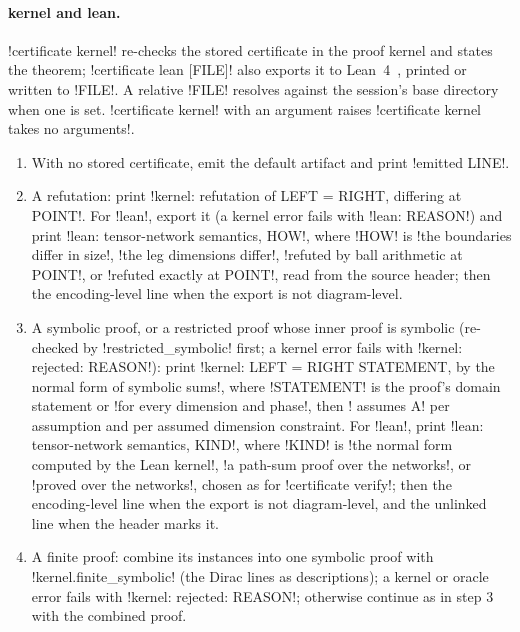 \paragraph{kernel and lean.} \code!certificate kernel! re-checks the stored certificate in the proof kernel and states the theorem; \code!certificate lean [FILE]! also exports it to Lean~4~\cite{demoura2021lean4}, printed or written to \code!FILE!. A relative \code!FILE! resolves against the session's base directory when one is set. \code!certificate kernel! with an argument raises \code!certificate kernel takes no arguments!.

\begin{algorithm}\label{alg:language-kernel}
\leavevmode
\begin{enumerate}
\item With no stored certificate, emit the default artifact and print \code!emitted LINE!.
\item A refutation: print \code!kernel: refutation of LEFT = RIGHT, differing at POINT!. For \code!lean!, export it (a kernel error fails with \code!lean: REASON!) and print \code!lean: tensor-network semantics, HOW!, where \code!HOW! is \code!the boundaries differ in size!, \code!the leg dimensions differ!, \code!refuted by ball arithmetic at POINT!, or \code!refuted exactly at POINT!, read from the source header; then the encoding-level line when the export is not diagram-level.
\item A symbolic proof, or a restricted proof whose inner proof is symbolic (re-checked by \py!restricted_symbolic! first; a kernel error fails with \code!kernel: rejected: REASON!): print \code!kernel: LEFT = RIGHT STATEMENT, by the normal form of symbolic sums!, where \code!STATEMENT! is the proof's domain statement or \code!for every dimension and phase!, then \code!  assumes A! per assumption and per assumed dimension constraint. For \code!lean!, print \code!lean: tensor-network semantics, KIND!, where \code!KIND! is \code!the normal form computed by the Lean kernel!, \code!a path-sum proof over the networks!, or \code!proved over the networks!, chosen as for \code!certificate verify!; then the encoding-level line when the export is not diagram-level, and the unlinked line when the header marks it.
\item A finite proof: combine its instances into one symbolic proof with \py!kernel.finite_symbolic! (the Dirac lines as descriptions); a kernel or oracle error fails with \code!kernel: rejected: REASON!; otherwise continue as in step 3 with the combined proof.

\end{enumerate}
\end{algorithm}
